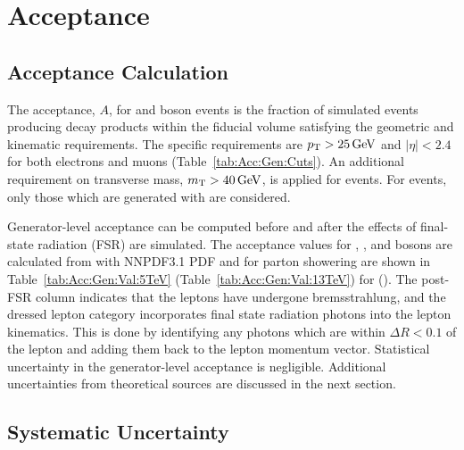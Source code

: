 \chapter{Acceptance}\label{ch:acceptance}

\section{Acceptance Calculation}
The acceptance, $A$, for \Wpm and \Z boson events is the fraction of simulated events producing decay products within the fiducial volume satisfying the geometric and kinematic requirements. The specific requirements are $p_{\mathrm{T}}>25\,\text{Ge\hspace{-.08em}V}$ and $|\eta| < 2.4$ for both electrons and muons (Table~\ref{tab:Acc:Gen:Cuts}). An additional requirement on transverse mass, $m_{\mathrm{T}} > 40 \,\text{Ge\hspace{-.08em}V}$, is
applied for \Wpm events. For \Z events, only those which are generated with \masswindow are considered.

Generator-level acceptance can be computed before and after the effects of final-state radiation (FSR) are simulated. The acceptance values for \Wp, \Wm, and \Z bosons are calculated from \aMCATNLO with NNPDF3.1 PDF and  for parton showering are shown in Table~\ref{tab:Acc:Gen:Val:5TeV} (Table~\ref{tab:Acc:Gen:Val:13TeV}) for \serag (\serah). The post-FSR column indicates that the leptons have undergone bremsstrahlung, and the dressed lepton category incorporates final state radiation photons into the lepton kinematics. This is done by identifying any photons which are within $\Delta R < 0.1$ of the lepton and adding them back to the lepton momentum vector. Statistical uncertainty in the generator-level acceptance is negligible. Additional uncertainties from theoretical sources are discussed in the next section.



% 
% 

\section{Systematic Uncertainty}\label{ch:acc:unc}

